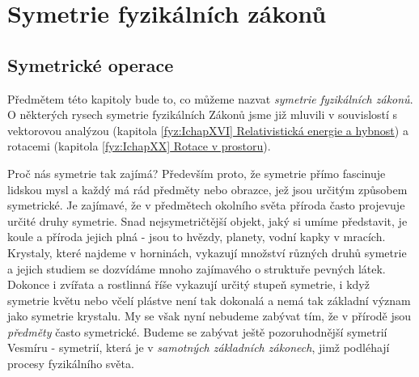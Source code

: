 \setchaptertoc
\chapter{Symetrie fyzikálních zákonů}\label{fyz:IchapLII}
  \section{Symetrické operace}\label{fyz:IchapLIIsecI}
    Předmětem této kapitoly bude to, co můžeme nazvat \emph{symetrie fyzikálních zákonů}. O
    některých rysech symetrie fyzikálních Zákonů jsme již mluvili v souvislostí s vektorovou
    analýzou (kapitola \hyperref[fyz:IchapXVI]{\ref*{fyz:IchapXVI} Relativistická energie a
    hybnost}) a rotacemi (kapitola \hyperref[fyz:IchapXX]{\ref*{fyz:IchapXX} Rotace v prostoru}).

    Proč nás symetrie tak zajímá? Především proto, že symetrie přímo fascinuje lidskou mysl a každý
    má rád předměty nebo obrazce, jež jsou určitým způsobem symetrické. Je zajímavé, že v předmětech
    okolního světa příroda často projevuje určité druhy symetrie. Snad nejsymetričtější objekt, jaký
    si umíme představit, je koule a příroda jejich plná - jsou to hvězdy, planety, vodní kapky v
    mracích. Krystaly, které najdeme v horninách, vykazují množství různých druhů symetrie a jejich
    studiem se dozvídáme mnoho zajímavého o struktuře pevných látek. Dokonce i zvířata a rostlinná
    říše vykazují určitý stupeň symetrie, i když symetrie květu nebo včelí plástve není tak dokonalá
    a nemá tak základní význam jako symetrie krystalu. My se však nyní nebudeme zabývat tím, že v
    přírodě jsou \emph{předměty} často symetrické. Budeme se zabývat ještě pozoruhodnější symetrií
    Vesmíru - symetrií, která je v \emph{samotných základních zákonech}, jimž podléhají procesy
    fyzikálního světa.
    
